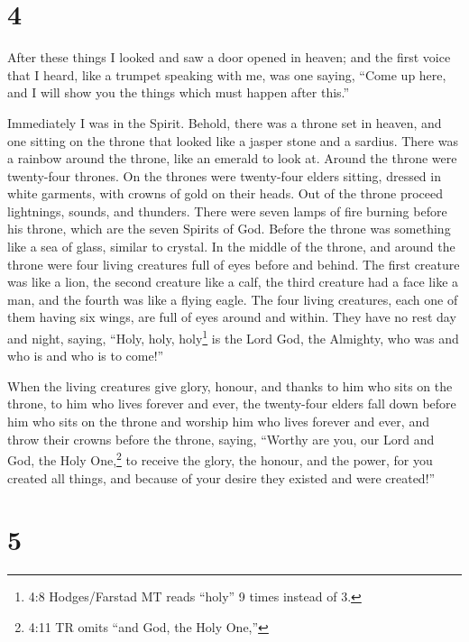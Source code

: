 \hypertarget{section-3}{%
\section{4}\label{section-3}}

 After these things I looked and saw a door opened in
heaven; and the first voice that I heard, like a trumpet speaking with
me, was one saying, ``Come up here, and I will show you the things which
must happen after this.''

 Immediately I was in the Spirit. Behold, there was a throne
set in heaven, and one sitting on the throne  that looked
like a jasper stone and a sardius. There was a rainbow around the
throne, like an emerald to look at.  Around the throne were
twenty-four thrones. On the thrones were twenty-four elders sitting,
dressed in white garments, with crowns of gold on their heads.
 Out of the throne proceed lightnings, sounds, and thunders.
There were seven lamps of fire burning before his throne, which are the
seven Spirits of God.  Before the throne was something like
a sea of glass, similar to crystal. In the middle of the throne, and
around the throne were four living creatures full of eyes before and
behind.  The first creature was like a lion, the second
creature like a calf, the third creature had a face like a man, and the
fourth was like a flying eagle.  The four living creatures,
each one of them having six wings, are full of eyes around and within.
They have no rest day and night, saying, ``Holy, holy, holy\footnote{4:8
  Hodges/Farstad MT reads ``holy'' 9 times instead of 3.} is the Lord
God, the Almighty, who was and who is and who is to come!''

 When the living creatures give glory, honour, and thanks to
him who sits on the throne, to him who lives forever and ever,
 the twenty-four elders fall down before him who sits on
the throne and worship him who lives forever and ever, and throw their
crowns before the throne, saying,  ``Worthy are you, our
Lord and God, the Holy One,\footnote{4:11 TR omits ``and God, the Holy
  One,''} to receive the glory, the honour, and the power, for you
created all things, and because of your desire they existed and were
created!''

\hypertarget{section-4}{%
\section{5}\label{section-4}}

